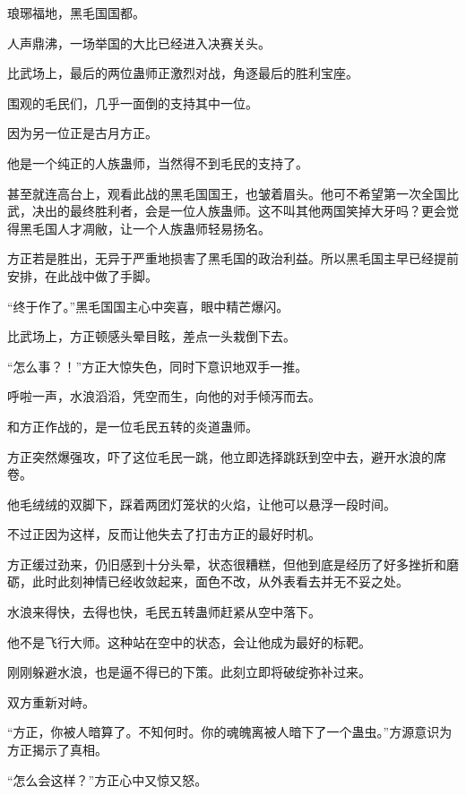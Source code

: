 
\begin{this_body}



琅琊福地，黑毛国国都。

人声鼎沸，一场举国的大比已经进入决赛关头。

比武场上，最后的两位蛊师正激烈对战，角逐最后的胜利宝座。

围观的毛民们，几乎一面倒的支持其中一位。

因为另一位正是古月方正。

他是一个纯正的人族蛊师，当然得不到毛民的支持了。

甚至就连高台上，观看此战的黑毛国国王，也皱着眉头。他可不希望第一次全国比武，决出的最终胜利者，会是一位人族蛊师。这不叫其他两国笑掉大牙吗？更会觉得黑毛国人才凋敝，让一个人族蛊师轻易扬名。

方正若是胜出，无异于严重地损害了黑毛国的政治利益。所以黑毛国主早已经提前安排，在此战中做了手脚。

“终于作了。”黑毛国国主心中突喜，眼中精芒爆闪。

比武场上，方正顿感头晕目眩，差点一头栽倒下去。

“怎么事？！”方正大惊失色，同时下意识地双手一推。

呼啦一声，水浪滔滔，凭空而生，向他的对手倾泻而去。

和方正作战的，是一位毛民五转的炎道蛊师。

方正突然爆强攻，吓了这位毛民一跳，他立即选择跳跃到空中去，避开水浪的席卷。

他毛绒绒的双脚下，踩着两团灯笼状的火焰，让他可以悬浮一段时间。

不过正因为这样，反而让他失去了打击方正的最好时机。

方正缓过劲来，仍旧感到十分头晕，状态很糟糕，但他到底是经历了好多挫折和磨砺，此时此刻神情已经收敛起来，面色不改，从外表看去并无不妥之处。

水浪来得快，去得也快，毛民五转蛊师赶紧从空中落下。

他不是飞行大师。这种站在空中的状态，会让他成为最好的标靶。

刚刚躲避水浪，也是逼不得已的下策。此刻立即将破绽弥补过来。

双方重新对峙。

“方正，你被人暗算了。不知何时。你的魂魄离被人暗下了一个蛊虫。”方源意识为方正揭示了真相。

“怎么会这样？”方正心中又惊又怒。


\end{this_body}
